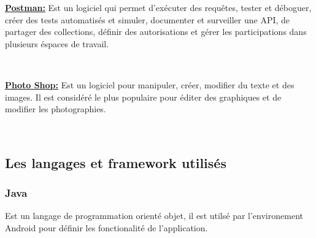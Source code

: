 \documentclass[french,a4,12pt]{report}
\begin{document}
\begin{itemize}
\begin{minipage}{0.5\textwidth}
\item{ \underline{ \textbf{Postman:}}}
Est un logiciel qui permet d'exécuter des requêtes, tester et déboguer, créer des tests automatisés et simuler, documenter et surveiller une API, de partager des collections, définir des autorisations et gérer les participations dans plusieurs éspaces de travail.
\end{minipage}
~

\begin{minipage}{0.5\textwidth}
	\item{ \underline{ \textbf{Photo Shop:}}}
Est un logiciel pour manipuler, créer, modifier du texte et des images. Il est considéré le plus populaire pour éditer des graphiques et de modifier les photographies.
\end{minipage}
~
\end{itemize}
\begin{tcolorbox}[colframe=green!75,rightrule=0.5cm,leftrule=0.5cm,]
	\centering
	\subsection{Les langages et framework utilisés}
\end{tcolorbox}

	\subsubsection*{Java}
\begin{minipage}{0.5\textwidth}
Est un langage de programmation orienté objet, il est utilsé par l'environement Android pour définir les fonctionalité de l'application. 
\end{minipage}
~
\end{document}
